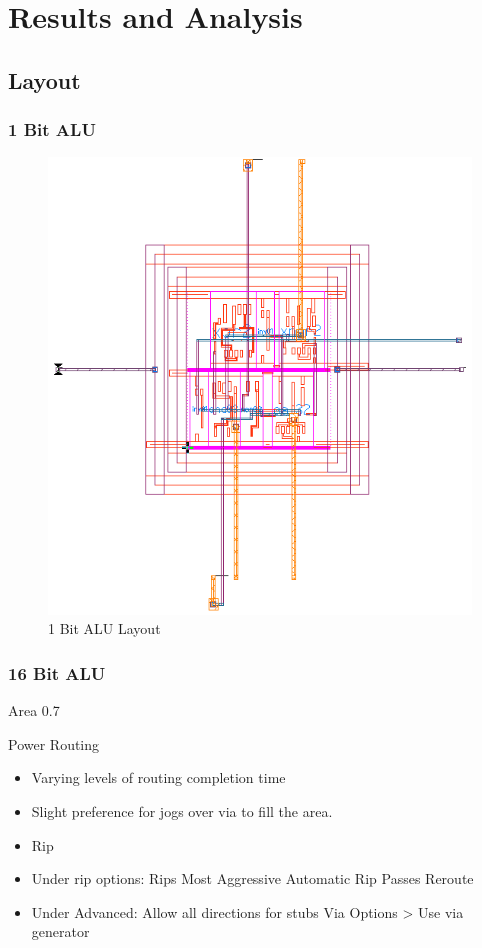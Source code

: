 \documentclass[11pt]{article}
\begin{document}
\section{Results and Analysis}
		
		
	\subsection{Layout}
	
		\subsubsection{1 Bit ALU}
		
			\begin{figure}[H]
				\centering
				\includegraphics[width=0.7\linewidth]{"Pictures/ALU-1Bit Layout"}
				\caption{1 Bit ALU Layout}
				\label{fig:alu-1bit-layout}
			\end{figure}
			
	
		\subsubsection{16 Bit ALU}
			
			Area 0.7
			
			Power Routing
			\begin{itemize}
				\item Varying levels of routing completion time
				\item Slight preference for jogs over via to fill the area.
				\item Rip
				\item Under rip options: 
				\subitem Rips Most Aggressive
				\subitem Automatic Rip Passes
				\subitem Reroute
				\item Under Advanced:
				\subitem Allow all directions for stubs
				\subitem Via Options > Use via generator
			\end{itemize}
		
\end{document}
